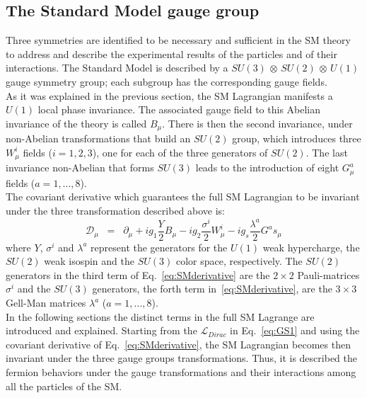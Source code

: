 \subsection{The Standard Model gauge group}\label{sec:gauge group}
Three symmetries are identified to be necessary and sufficient in the SM theory to address and describe the experimental results of the particles and of their interactions. The Standard Model is described by a $SU(3)$ $\otimes$ $SU(2)$ $\otimes$ $U(1)$ gauge symmetry group; each subgroup has the corresponding gauge fields.\\
As it was explained in the previous section, the SM Lagrangian manifests a $U(1)$ local phase invariance. The associated gauge field to this Abelian invariance of the theory is called $B_\mu$. There is then the second invariance, under non-Abelian transformations that build an $SU(2)$ group, which introduces three $W^i_\mu$ fields ($i = 1,2,3$), one for each of the three generators of $SU(2)$. The last invariance non-Abelian that forms $SU(3)$ leads to the introduction of eight $G^a_\mu$ fields ($a = 1,...,8$).\\
The covariant derivative which guarantees the full SM Lagrangian to be invariant under the three transformation described above is:
\begin{equation}
\label{eq:SMderivative}
\mathcal{D}_{\mu} \;\; = \;\; \partial_{\mu} + ig_1\frac{Y}{2}B_{\mu} - ig_2\frac{\sigma^i}{2}W^i_{\mu} - ig_s\frac{\lambda^a}{2}G^as_{\mu}
\end{equation}
where $Y$, $\sigma^i$ and $\lambda^a$ represent the generators for the $U(1)$ weak hypercharge, the $SU(2)$ weak isospin and the $SU(3)$ color space, respectively. The $SU(2)$ generators in the third term of Eq.~\ref{eq:SMderivative} are the $2\times2$ Pauli-matrices $\sigma^i$ and the $SU(3)$ generators, the forth term in~\ref{eq:SMderivative}, are the $3\times3$ Gell-Man matrices $\lambda^a$ ($a = 1,...,8$).\\

In the following sections the distinct terms in the full SM Lagrange are introduced and explained. Starting from the $\mathcal{L}_{Dirac}$ in Eq.~\ref{eq:GS1} and using the covariant derivative of Eq.~\ref{eq:SMderivative}, the SM Lagrangian becomes then invariant under the three gauge groups transformations. Thus, it is described the fermion behaviors under the gauge transformations and their interactions among all the particles of the SM. 

